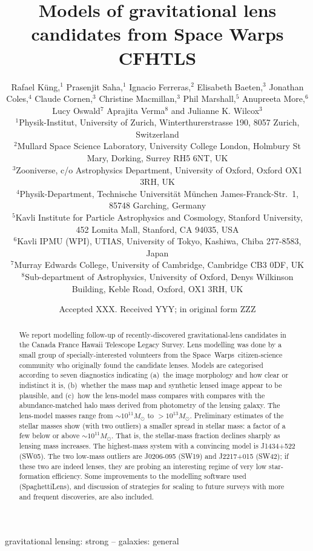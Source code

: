 \documentclass[fleqn,usenatbib]{template/mnras}
\title[Lens models for Space Warps CFHTLS]{Models of gravitational lens candidates from
  Space Warps CFHTLS}
\author[K\"ung et al]{Rafael K\"ung,$^{1}$
Prasenjit Saha,$^{1}$
Ignacio Ferreras,$^{2}$
Elisabeth Baeten,$^{3}$
\newauthor
Jonathan Coles,$^{4}$
Claude Cornen,$^{3}$
Christine Macmillan,$^{3}$
Phil Marshall,$^{5}$ 
\newauthor
Anupreeta More,$^{6}$
Lucy Oswald$^{7}$
Aprajita Verma$^{8}$
and Julianne K. Wilcox$^{3}$
%
\\
%
$^{1}$Physik-Institut, University of Zurich, Winterthurerstrasse 190, 8057 Zurich, Switzerland\\
$^{2}$Mullard Space Science Laboratory, University College London, Holmbury St Mary, Dorking, Surrey RH5 6NT, UK\\
$^{3}$Zooniverse, c/o Astrophysics Department, University of Oxford, Oxford OX1 3RH, UK \\
$^{4}$Physik-Department, Technische Universit\"at M\"unchen
James-Franck-Str.~1, 85748 Garching, Germany\\
$^{5}$Kavli Institute for Particle Astrophysics and Cosmology, Stanford University, 452 Lomita Mall, Stanford, CA 94035, USA\\
$^{6}$Kavli IPMU (WPI), UTIAS, University of Tokyo, Kashiwa, Chiba 277-8583, Japan\\
$^{7}$Murray Edwards College, University of Cambridge, Cambridge CB3 0DF, UK\\
$^{8}$Sub-department of Astrophysics, University of Oxford, Denys Wilkinson Building, Keble Road, Oxford, OX1 3RH, UK\\
}
\date{Accepted XXX. Received YYY; in original form ZZZ}
\newcommand{\SW}{Space~Warps\xspace}
\begin{document}
\label{firstpage}
\pagerange{\pageref{firstpage}--\pageref{lastpage}}
\maketitle

\begin{abstract}
We report modelling follow-up of recently-discovered
gravitational-lens candidates in the Canada France Hawaii Telescope
Legacy Survey. Lens modelling was done by a small group of
specially-interested volunteers from the \SW\ citizen-science community
who originally found the candidate lenses.  Models are categorised
according to seven diagnostics indicating (a)~the image morphology and
how clear or indistinct it is, (b)~whether the mass map and synthetic
lensed image appear to be plausible, and (c)~how the lens-model mass
compares with compares with the abundance-matched halo mass derived
from photometry of the lensing galaxy.
The lens-model masses range from $\sim10^{11}M_\odot$ to
$>10^{13}M_\odot$.  Preliminary estimates of the stellar masses show
(with two outliers) a smaller spread in stellar mass: a factor of a
few below or above $\sim10^{11}M_\odot$.  That is, the stellar-mass
fraction declines sharply as lensing mass increases.  The highest-mass
system with a convincing model is J1434+522 (SW05).  The two low-mass
outliers are J0206-095 (SW19) and J2217+015 (SW42); if these two are
indeed lenses, they are probing an interesting regime of very low
star-formation efficiency.
Some improvements to the modelling software used (SpaghettiLens), and
discussion of strategies for scaling to future surveys with more and
frequent discoveries, are also included.
\end{abstract}

\begin{keywords}
gravitational lensing: strong -- galaxies: general
\end{keywords}














\end{document}
